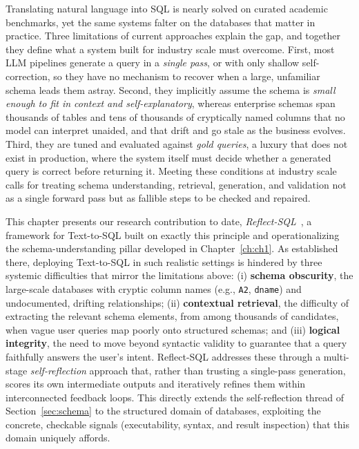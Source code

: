 Translating natural language into SQL is nearly solved on curated academic benchmarks, yet the same systems falter on the databases that matter in practice. Three limitations of current approaches explain the gap, and together they define what a system built for industry scale must overcome. First, most LLM pipelines generate a query in a \emph{single pass}, or with only shallow self-correction, so they have no mechanism to recover when a large, unfamiliar schema leads them astray. Second, they implicitly assume the schema is \emph{small enough to fit in context and self-explanatory}, whereas enterprise schemas span thousands of tables and tens of thousands of cryptically named columns that no model can interpret unaided, and that drift and go stale as the business evolves. Third, they are tuned and evaluated against \emph{gold queries}, a luxury that does not exist in production, where the system itself must decide whether a generated query is correct before returning it. Meeting these conditions at industry scale calls for treating schema understanding, retrieval, generation, and validation not as a single forward pass but as fallible steps to be checked and repaired.

This chapter presents our research contribution to date, \emph{Reflect-SQL}~\cite{jain2027reflectsql}, a framework for Text-to-SQL built on exactly this principle and operationalizing the schema-understanding pillar developed in Chapter~\ref{ch:ch1}. As established there, deploying Text-to-SQL in such realistic settings is hindered by three systemic difficulties that mirror the limitations above: (i) \textbf{schema obscurity}, the large-scale databases with cryptic column names (e.g., \texttt{A2}, \texttt{dname}) and undocumented, drifting relationships; (ii) \textbf{contextual retrieval}, the difficulty of extracting the relevant schema elements, from among thousands of candidates, when vague user queries map poorly onto structured schemas; and (iii) \textbf{logical integrity}, the need to move beyond syntactic validity to guarantee that a query faithfully answers the user's intent. Reflect-SQL addresses these through a multi-stage \emph{self-reflection} approach that, rather than trusting a single-pass generation, scores its own intermediate outputs and iteratively refines them within interconnected feedback loops. This directly extends the self-reflection thread of Section~\ref{sec:schema} to the structured domain of databases, exploiting the concrete, checkable signals (executability, syntax, and result inspection) that this domain uniquely affords.


